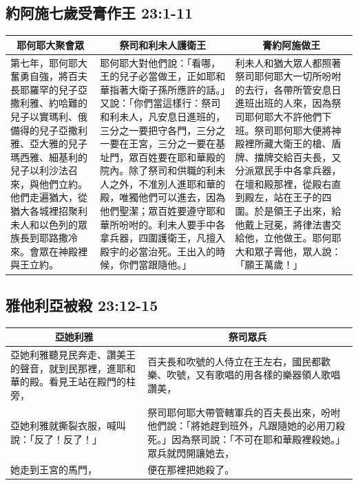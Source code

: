 \subsection{約阿施七歲受膏作王 23:1-11}
\begin{table}[H]
\centering 
\begin{tabular}{p{4.35cm}|p{7.2cm}|p{5.9cm}}\hline\hline
\multicolumn{1}{c|}{耶何耶大聚會眾}&\multicolumn{1}{c|}{祭司和利未人護衛王}&\multicolumn{1}{c}{膏約阿施做王}\\\hline\hline
第七年，耶何耶大奮勇自強，將百夫長耶羅罕的兒子亞撒利雅、約哈難的兒子以實瑪利、俄備得的兒子亞撒利雅、亞大雅的兒子瑪西雅、細基利的兒子以利沙法召來，與他們立約。他們走遍猶大，從猶大各城裡招聚利未人和以色列的眾族長到耶路撒冷來。會眾在神殿裡與王立約。
&耶何耶大對他們說：「看哪，王的兒子必當做王，正如耶和華指著大衛子孫所應許的話。」又說：「你們當這樣行：祭司和利未人，凡安息日進班的，三分之一要把守各門，三分之一要在王宮，三分之一要在基址門，眾百姓要在耶和華殿的院內。除了祭司和供職的利未人之外，不准別人進耶和華的殿，唯獨他們可以進去，因為他們聖潔；眾百姓要遵守耶和華所吩咐的。利未人要手中各拿兵器，四圍護衛王，凡擅入殿宇的必當治死。王出入的時候，你們當跟隨他。」
&利未人和猶大眾人都照著祭司耶何耶大一切所吩咐的去行，各帶所管安息日進班出班的人來，因為祭司耶何耶大不許他們下班。祭司耶何耶大便將神殿裡所藏大衛王的槍、盾牌、擋牌交給百夫長，又分派眾民手中各拿兵器，在壇和殿那裡，從殿右直到殿左，站在王子的四圍。於是領王子出來，給他戴上冠冕，將律法書交給他，立他做王。耶何耶大和眾子膏他，眾人說：「願王萬歲！」\\\hline
\end{tabular}
\end{table}


\subsection{雅他利亞被殺 23:12-15}
\begin{table}[H]
\centering 
\begin{tabular}{p{7.25cm}|p{8.75cm}}\hline\hline
\multicolumn{1}{c|}{亞她利雅}&\multicolumn{1}{c}{祭司眾兵}\\\hline\hline
亞她利雅聽見民奔走、讚美王的聲音，就到民那裡，進耶和華的殿。看見王站在殿門的柱旁，
&百夫長和吹號的人侍立在王左右，國民都歡樂、吹號，又有歌唱的用各樣的樂器領人歌唱讚美，\\\hline
亞她利雅就撕裂衣服，喊叫說：「反了！反了！」&祭司耶何耶大帶管轄軍兵的百夫長出來，吩咐他們說：「將她趕到班外，凡跟隨她的必用刀殺死。」因為祭司說：「不可在耶和華殿裡殺她。」 眾兵就閃開讓她去，\\\hline
她走到王宮的馬門，&便在那裡把她殺了。
\\\hline
\end{tabular}
\end{table}


